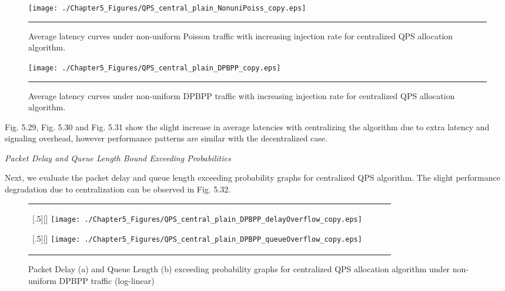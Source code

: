 \begin{figure}[htbp]
  \centering
    \texttt{[image: ./Chapter5\_Figures/QPS\_central\_plain\_NonuniPoiss\_copy.eps]}
    \rule{35em}{0.5pt}
  \caption[Centralized QPS Allocation Average latency under non-uniform Poisson]{Average latency curves under non-uniform Poisson traffic with increasing injection rate for centralized QPS allocation algorithm.}
  \label{fig:Electron}
\end{figure}


\begin{figure}[htbp]
  \centering
    \texttt{[image: ./Chapter5\_Figures/QPS\_central\_plain\_DPBPP\_copy.eps]}
    \rule{35em}{0.5pt}
  \caption[Centralized QPS Allocation Average latency under non-uniform DPBPP]{Average latency curves under non-uniform DPBPP traffic with increasing injection rate for centralized QPS allocation algorithm.}
  \label{fig:Electron}
\end{figure}


Fig. 5.29, Fig. 5.30 and Fig. 5.31 show the slight increase in average latencies with centralizing the algorithm due to extra latency and signaling overhead, however performance patterns are similar with the decentralized case. 

\pagebreak

\textit{Packet Delay and Queue Length Bound Exceeding Probabilities}

Next, we evaluate the packet delay and queue length exceeding probability graphs for centralized QPS algorithm. The slight performance degradation due to centralization can be observed in Fig. 5.32.

\begin{figure*}[htbp]
  \centering
  \begin{tabular}[c]{cccc}

  \subcaptionbox{}[.5\linewidth][]{%
    \texttt{[image: ./Chapter5\_Figures/QPS\_central\_plain\_DPBPP\_delayOverflow\_copy.eps]} }	
    
  \subcaptionbox{}[.5\linewidth][]{%
    \texttt{[image: ./Chapter5\_Figures/QPS\_central\_plain\_DPBPP\_queueOverflow\_copy.eps]}}
 
   \end{tabular}

  \caption{Packet Delay (a) and Queue Length (b) exceeding probability graphs for centralized QPS allocation algorithm under non-uniform DPBPP traffic (log-linear)}
\end{figure*}



